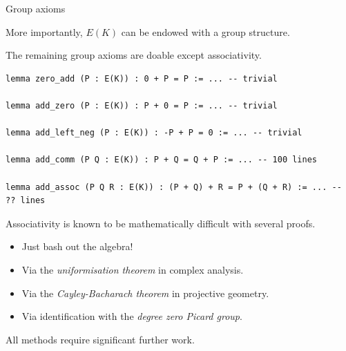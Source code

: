 \documentclass[10pt]{beamer}
\begin{document}
\begin{frame}[fragile, t]{Group axioms}

More importantly, $ E(K) $ can be endowed with a group structure.

\vspace{0.5cm}

The remaining group axioms are doable except associativity.

\begin{lstlisting}[basicstyle=\scriptsize, frame=single]
lemma zero_add (P : E(K)) : 0 + P = P := ... -- trivial

lemma add_zero (P : E(K)) : P + 0 = P := ... -- trivial

lemma add_left_neg (P : E(K)) : -P + P = 0 := ... -- trivial

lemma add_comm (P Q : E(K)) : P + Q = Q + P := ... -- 100 lines

lemma add_assoc (P Q R : E(K)) : (P + Q) + R = P + (Q + R) := ... -- ?? lines
\end{lstlisting}

Associativity is known to be mathematically difficult with several proofs.
\begin{itemize}
\item Just bash out the algebra!
\item Via the \emph{uniformisation theorem} in complex analysis.
\item Via the \emph{Cayley-Bacharach theorem} in projective geometry.
\item Via identification with the \emph{degree zero Picard group}.
\end{itemize}
All methods require significant further work.

\end{frame}
\end{document}
